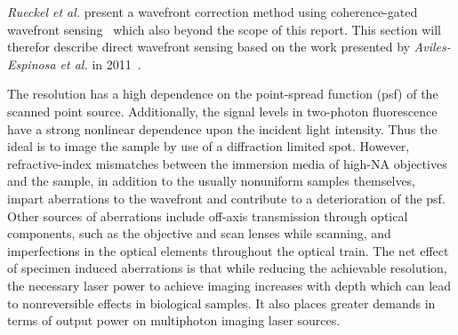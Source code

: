 \emph{Rueckel et al.} present a wavefront correction method using coherence-gated wavefront sensing~\cite{scan_TPFM_gated_wavefront} which also beyond the scope of this report. This section will therefor describe direct wavefront sensing based on the work presented by \emph{Aviles-Espinosa et al.} in 2011~\cite{scan_TPFM_guide_start}.

The resolution has a high dependence on the point-spread function (psf) of the scanned point source. Additionally, the signal levels in two-photon fluorescence have a strong nonlinear dependence upon the incident light intensity. Thus the ideal is to image the sample by use of a diffraction limited spot. However, refractive-index mismatches between the immersion media of high-NA objectives and the sample, in addition to the usually nonuniform samples themselves, impart aberrations to the wavefront and contribute to a deterioration of the psf. Other sources of aberrations include off-axis transmission through optical components, such as the objective and scan lenses while scanning, and imperfections in the optical elements throughout the optical train. The net effect of specimen induced aberrations is that while reducing the achievable resolution, the necessary laser power to achieve imaging increases with depth which can lead to nonreversible effects in biological samples. It also places greater demands in terms of output power on multiphoton imaging laser sources.

